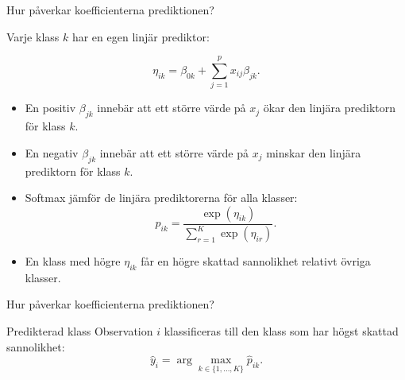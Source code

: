 \documentclass[10pt,english]{beamer}
\begin{document}
\begin{frame}{Hur påverkar koefficienterna prediktionen?}

    Varje klass \(k\) har en egen linjär prediktor:

    \[
        \eta_{ik}
        =
        \beta_{0k}
        +
        \sum_{j=1}^{p} x_{ij}\beta_{jk}.
    \]

    \begin{itemize}
        \item En positiv \(\beta_{jk}\) innebär att ett större värde på
              \(x_j\) ökar den linjära prediktorn för klass \(k\).

        \item En negativ \(\beta_{jk}\) innebär att ett större värde på
              \(x_j\) minskar den linjära prediktorn för klass \(k\).

        \item Softmax jämför de linjära prediktorerna för alla klasser:
              \[
                  p_{ik}
                  =
                  \frac{\exp(\eta_{ik})}
                       {\displaystyle
                        \sum_{r=1}^{K}\exp(\eta_{ir})}.
              \]

        \item En klass med högre \(\eta_{ik}\) får en högre skattad
              sannolikhet relativt övriga klasser.
    \end{itemize}

    

\end{frame}


\begin{frame}{Hur påverkar koefficienterna prediktionen?}



    \begin{block}{Predikterad klass}
        Observation \(i\) klassificeras till den klass som har högst
        skattad sannolikhet:
        \[
            \widehat{y}_i
            =
            \arg\max_{k\in\{1,\ldots,K\}}
            \widehat{p}_{ik}.
        \]
    \end{block}

\end{frame}
\end{document}
